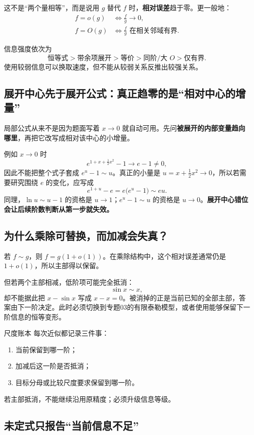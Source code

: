 \documentclass[11pt,a4paper]{ctexart}
\newcommand{\kw}[1]{\textbf{\color{deep}#1}}
\begin{document}
这不是“两个量相等”，而是说用 $g$ 替代 $f$ 时，\kw{相对误差}趋于零。更一般地：
\begin{align*}
f=o(g)&\iff \frac{f}{g}\to0,\\
f=O(g)&\iff \frac{f}{g}\text{ 在相关邻域有界}.
\end{align*}

信息强度依次为
\[
\text{恒等式} > \text{带余项展开} > \text{等价} > \text{同阶/大 }O > \text{仅有界}.
\]
使用较弱信息可以换取速度，但不能从较弱关系反推出较强关系。

\subsection{展开中心先于展开公式：真正趋零的是“相对中心的增量”}

局部公式从来不是因为题面写着 $x\to0$ 就自动可用。先问\kw{被展开的内部变量趋向哪里}，再把它改写成相对该中心的小增量。

例如 $x\to0$ 时
\[
e^{1+x+\frac12x^2}-1\to e-1\ne0,
\]
因此不能把整个式子套成 $e^u-1\sim u$。真正的小量是 $u=x+\frac12x^2\to0$，所以若需要研究围绕 $e$ 的变化，应写成
\[
e^{1+u}-e=e\bigl(e^u-1\bigr)\sim eu.
\]
同理，$\ln u\sim u-1$ 的资格是 $u\to1$；$e^u-1\sim u$ 的资格是 $u\to0$。\kw{展开中心错位会让后续阶数判断从第一步就失效。}

\subsection{为什么乘除可替换，而加减会失真？}

若 $f\sim g$，则 $f=g(1+o(1))$。在乘除结构中，这个相对误差通常仍是 $1+o(1)$，所以主部得以保留。

但若两个主部相减，低阶项可能完全抵消：
\[
\sin x\sim x,
\]
却不能据此把 $x-\sin x$ 写成 $x-x=0$。被消掉的正是当前已知的全部主部，答案由下一阶决定。此时必须切换到专题03的有限泰勒模型，或者使用能够保留下一阶信息的恒等变形。

\begin{methodbox}{尺度账本}
每次近似都记录三件事：
\begin{enumerate}
  \item 当前保留到哪一阶；
  \item 加减后这一阶是否抵消；
  \item 目标分母或比较尺度要求保留到哪一阶。
\end{enumerate}
若主部抵消，不能继续沿用原精度；必须升级信息等级。
\end{methodbox}

\subsection{未定式只报告“当前信息不足”}
\end{document}
